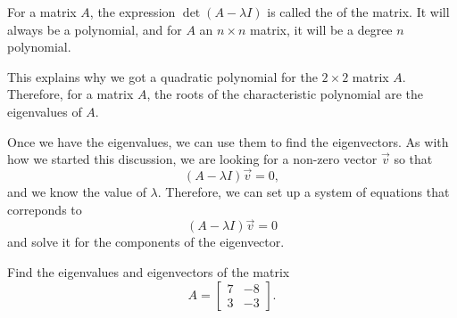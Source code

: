 \begin{definition}
For a matrix $A$, the expression $\det(A - \lambda I)$ is called the \emph{} of the matrix. It will always be a polynomial, and for $A$ an $n \times n$ matrix, it will be a degree $n$ polynomial.
\end{definition}
This explains why we got a quadratic polynomial for the $2 \times 2$ matrix $A$. Therefore, for a matrix $A$, the roots of the characteristic polynomial are the eigenvalues of $A$. 

Once we have the eigenvalues, we can use them to find the eigenvectors. As with how we started this discussion, we are looking for a non-zero vector $\vec{v}$ so that \[ (A - \lambda I)\vec{v} = 0,\] and we know the value of $\lambda$. Therefore, we can set up a system of equations that correponds to \[ (A - \lambda I)\vec{v} = 0\] and solve it for the components of the eigenvector. 

\begin{example}
Find the eigenvalues and eigenvectors of the matrix
\[ A = \begin{bmatrix} 7 & -8 \\ 3 & -3 \end{bmatrix}.\]
\end{example}

